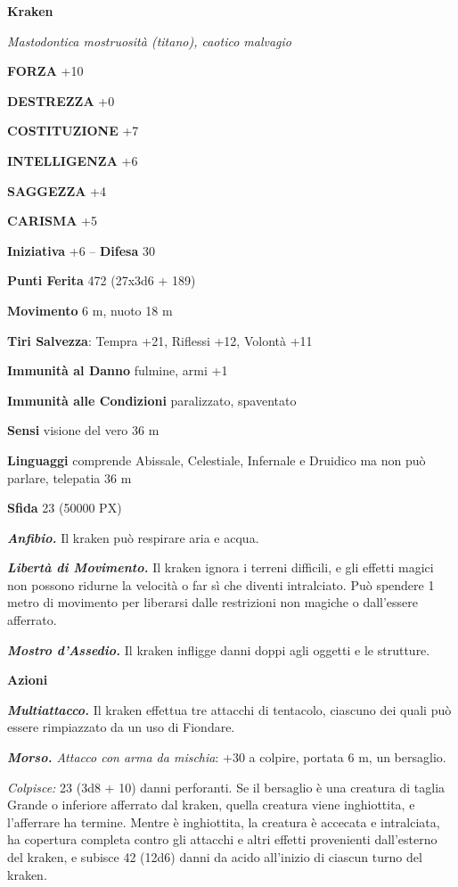 \begin{multicols}{2}
\medskip{}\textbf{Kraken}

\textit{Mastodontica mostruosità (titano), caotico malvagio}

\textbf{FORZA} +10

\textbf{DESTREZZA} +0

\textbf{COSTITUZIONE} +7

\textbf{INTELLIGENZA} +6

\textbf{SAGGEZZA} +4

\textbf{CARISMA} +5

\textbf{Iniziativa} +6 -- \textbf{Difesa} 30

\textbf{Punti Ferita} 472 (27x3d6 + 189)

\textbf{Movimento} 6 m, nuoto 18 m

\textbf{Tiri Salvezza}: Tempra +21, Riflessi +12, Volontà +11

\textbf{Immunità al Danno} fulmine, armi +1

\textbf{Immunità alle Condizioni} paralizzato, spaventato

\textbf{Sensi} visione del vero 36 m

\textbf{Linguaggi} comprende Abissale, Celestiale, Infernale e Druidico ma non può parlare, telepatia 36 m

\textbf{Sfida} 23 (50000 PX)

\textit{\textbf{Anfibio.}} Il kraken può respirare aria e acqua.

\textit{\textbf{Libertà di Movimento.}} Il kraken ignora i terreni difficili, e gli effetti magici non possono ridurne la velocità o far sì che diventi intralciato. Può spendere 1 metro di movimento per liberarsi dalle restrizioni non magiche o dall'essere afferrato.

\textit{\textbf{Mostro d'Assedio.}} Il kraken infligge danni doppi agli oggetti e le strutture.

\textbf{Azioni}

\textit{\textbf{Multiattacco.}} Il kraken effettua tre attacchi di tentacolo, ciascuno dei quali può essere rimpiazzato da un uso di Fiondare.

\textit{\textbf{Morso.} Attacco con arma da mischia}: +30 a colpire, portata 6 m, un bersaglio.

\textit{Colpisce:} 23 (3d8 + 10) danni perforanti. Se il bersaglio è una creatura di taglia Grande o inferiore afferrato dal kraken, quella creatura viene inghiottita, e l'afferrare ha termine. Mentre è inghiottita, la creatura è accecata e intralciata, ha copertura completa contro gli attacchi e altri effetti provenienti dall'esterno del kraken, e subisce 42 (12d6) danni da acido all'inizio di ciascun turno del kraken.


\end{multicols}
